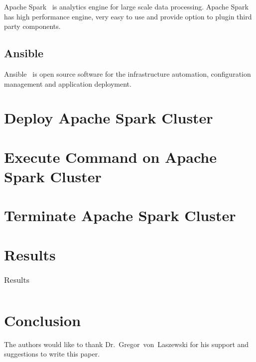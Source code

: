 Apache Spark~\cite{hid-sp18-511-www-spark} is analytics engine for large scale data processing. Apache Spark~\cite{hid-sp18-511-www-spark} has high performance engine, very easy to use and provide option to plugin third party components.

\subsection{Ansible}

Ansible~\cite{hid-sp18-511-www-ansible} is open source software for the infrastructure automation, configuration management and application deployment.

\section{Deploy Apache Spark Cluster}


\section{Execute Command on Apache Spark Cluster}


\section{Terminate Apache Spark Cluster}


\section{Results}

\begin{table}[hbt]
	\centering
	\caption{Results}\label{t:results-table}
	\begin{tabular}{llll}
	\end{tabular}
\end{table}


\section{Conclusion}



\begin{acks}

  The authors would like to thank Dr.~Gregor~von~Laszewski for his
  support and suggestions to write this paper.

\end{acks}


 


